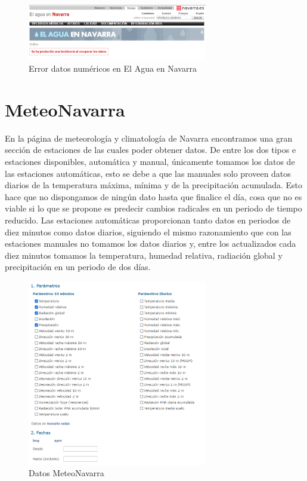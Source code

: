 \begin{figure} [h!]
	\centering
	\includegraphics[width=0.7\textwidth]{fig/ErrorAguaEnNavarra.png}
	\caption[Error al cargar directamente la página de datos numéricos en El Agua en Navarra]{Error datos numéricos en El Agua en Navarra}
	\label{fig:ej5}
\end{figure}

\section{MeteoNavarra}
En la página de meteorología y climatología de Navarra encontramos una gran sección de estaciones de las cuales poder obtener datos.
\newline
\newline
De entre los dos tipos e estaciones disponibles, automática y manual, únicamente tomamos los datos de las estaciones automáticas, esto se debe a que las manuales solo proveen datos diarios de la temperatura máxima, mínima y de la precipitación acumulada. Esto hace que no dispongamos de ningún dato hasta que finalice el día, cosa que no es viable si lo que se propone es predecir cambios radicales en un periodo de tiempo reducido.
\newline
\newline
Las estaciones automáticas proporcionan tanto datos en periodos de diez minutos como datos diarios, siguiendo el mismo razonamiento que con las estaciones manuales no tomamos los datos diarios y, entre los actualizados cada diez minutos tomamos la temperatura, humedad relativa, radiación global y precipitación en un periodo de dos días.

\begin{figure} [h!]
	\centering
	\includegraphics[width=0.7\textwidth]{fig/DatosMeteoNavarra.png}
	\caption[Apartado selección de datos MeteoNavarra]{Datos MeteoNavarra}
	\label{fig:ej6}
\end{figure}